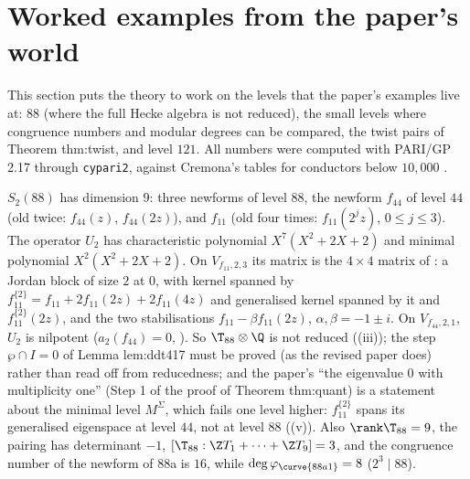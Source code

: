 \section{Worked examples from the paper's world}\label{sec:hecke:examples}

This section puts the theory to work on the levels that the paper's examples live at: $88$ (where the full Hecke algebra is not reduced), the small levels where congruence
numbers and modular degrees can be compared, the twist pairs of Theorem thm:twist, and level $121$. All numbers were computed with PARI/GP 2.17 through \texttt{cypari2}, against
Cremona's tables for conductors below $10{,}000$ \cite{Cremona97}.

\begin{example}[level $88$]\label{ex:hecke:level-88}
$S_2(88)$ has dimension $9$: three newforms of level $88$, the newform $f_{44}$ of level $44$ (old twice: $f_{44}(z)$, $f_{44}(2z)$), and $f_{11}$ (old four times: $f_{11}(2^jz)$, $0\le j\le3$). The operator $U_2$
has characteristic polynomial $X^7(X^2+2X+2)$ and minimal polynomial $X^2(X^2+2X+2)$. On $V_{f_{11},2,3}$ its matrix is the $4\times4$ matrix of : a Jordan block of size
$2$ at $0$, with kernel spanned by $f_{11}^{\{2\}}=f_{11}+2f_{11}(2z)+2f_{11}(4z)$ and generalised kernel spanned by it and $f_{11}^{\{2\}}(2z)$, and the two stabilisations $f_{11}-\beta f_{11}(2z)$,
$\alpha,\beta=-1\pm i$. On $V_{f_{44},2,1}$, $U_2$ is nilpotent ($a_2(f_{44})=0$, ). So $\T_{88}\otimes\Q$ is not reduced ((iii)); the step $\wp\cap I=0$ of
Lemma lem:ddt417 must be proved (as the revised paper does) rather than read off from reducedness; and the paper's ``the eigenvalue $0$ with multiplicity one'' (Step 1 of the proof of
Theorem thm:quant) is a statement about the minimal level $M^\Sigma$, which fails one level higher: $f_{11}^{\{2\}}$ spans its generalised eigenspace at level $44$, not at level $88$
((v)). Also $\rank\T_{88}=9$, the pairing has determinant $-1$, $[\T_{88}:\Z T_1+\cdots+\Z T_9]=3$, and the congruence number of the newform of 88a is $16$, while
$\deg\varphi_{\curve{88a1}}=8$ ($2^3\mid88$).
\end{example}

